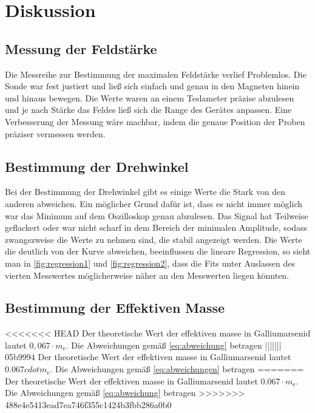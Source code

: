 \section{Diskussion}
\label{sec:Diskussion}

\subsection{Messung der Feldstärke}
Die Messreihe zur Bestimmung der maximalen Feldstärke verlief Problemlos. Die Sonde war fest 
justiert und ließ sich einfach und genau in den Magneten hinein und hinaus bewegen. Die Werte waren 
an einem Teslameter präzise abzulesen und je nach Stärke das Feldes ließ sich die Range des 
Gerätes anpassen. Eine Verbesserung der Messung wäre machbar, indem die genaue Position der Proben präziser vermessen werden.

\subsection{Bestimmung der Drehwinkel}
Bei der Bestimmung der Drehwinkel gibt es einige Werte die Stark von den anderen abweichen. Ein möglicher 
Grund dafür ist, dass es nicht immer möglich war das Minimum auf dem Oszilloskop genau abzulesen. Das Signal 
hat Teilweise geflackert oder war nicht scharf in dem Bereich der minimalen Amplitude, sodass zwangszweise die Werte 
zu nehmen sind, die stabil angezeigt werden. Die Werte die deutlich von der Kurve abweichen, beeinflussen die lineare Regression,
so sieht man in \autoref{fig:regression1} und \autoref{fig:regression2}, dass die Fits unter Auslassen des vierten Messwertes möglicherweise näher an den Messwerten
liegen könnten.

\subsection{Bestimmung der Effektiven Masse}
<<<<<<< HEAD
Der theoretische Wert der effektiven masse in Galliumarsenid lautet $0, 067 \cdot m_\text{e}$. Die Abweichungen gemäß \autoref{eq:abweichung} betragen
||||||| 05b9994
Der theoretische Wert der effektiven masse in Galliumarsenid lautet 0.067$cdot m_\text{e}$. Die Abweichungen gemäß \autoref{eq:abweichungen} betragen
=======
Der theoretische Wert der effektiven masse in Galliumarsenid lautet $\num{0.067} \cdot m_\text{e}$. Die Abweichungen gemäß \autoref{eq:abweichung} betragen
>>>>>>> 488e4e5413ead7ea746f355c1424b3fbb286a0b0

